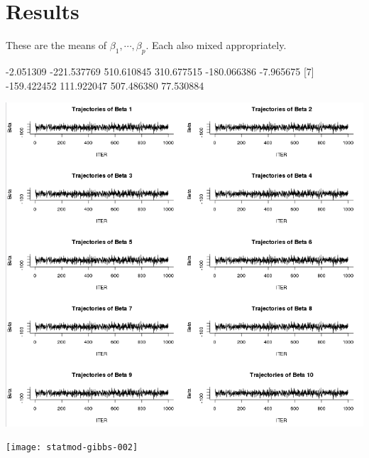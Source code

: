 \documentclass[12pt,letterpaper]{article}
\begin{document}
\section{Results}

These are the means of $\beta_1,\cdots,\beta_p$. Each also mixed appropriately.

\begin{Schunk}
\begin{Soutput}
 [1]   -2.051309 -221.537769  510.610845  310.677515 -180.066386   -7.965675
 [7] -159.422452  111.922047  507.486380   77.530884
\end{Soutput}
\end{Schunk}

\includegraphics{betas.png}

\texttt{[image: statmod-gibbs-002]}
\end{document}
